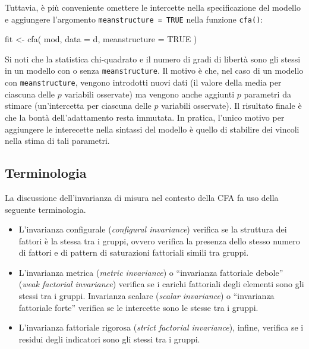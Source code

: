 \documentclass[
  11pt,
]{krantz}
\makeatletter
\newenvironment{Shaded}{\begin{snugshade}}{\end{snugshade}}
\newcommand{\AttributeTok}[1]{\textcolor[rgb]{0.61,0.61,0.61}{#1}}
\newcommand{\ConstantTok}[1]{\textcolor[rgb]{0,0,0}{#1}}
\newcommand{\FunctionTok}[1]{\textcolor[rgb]{0,0,0}{#1}}
\newcommand{\NormalTok}[1]{#1}
\newcommand{\OtherTok}[1]{\textcolor[rgb]{0.37,0.37,0.37}{#1}}
\providecommand{\tightlist}{%
  \setlength{\itemsep}{0pt}\setlength{\parskip}{0pt}}
\newenvironment{kframe}{%
\medskip{}
\setlength{\fboxsep}{.8em}
 \def\at@end@of@kframe{}%
 \ifinner\ifhmode%
  \def\at@end@of@kframe{\end{minipage}}%
  \begin{minipage}{\columnwidth}%
 \fi\fi%
 \def\FrameCommand##1{\hskip\@totalleftmargin \hskip-\fboxsep
 \colorbox{shadecolor}{##1}\hskip-\fboxsep
     \hskip-\linewidth \hskip-\@totalleftmargin \hskip\columnwidth}%
 \MakeFramed {\advance\hsize-\width
   \@totalleftmargin\z@ \linewidth\hsize
   \@setminipage}}%
 {\par\unskip\endMakeFramed%
 \at@end@of@kframe}
\renewenvironment{Shaded}{\begin{kframe}}{\end{kframe}}
\theoremstyle{definition}
\theoremstyle{definition}
\theoremstyle{definition}
\theoremstyle{definition}
\theoremstyle{remark}
\makeatother
\begin{document}
Tuttavia, è più conveniente omettere le intercette nella specificazione del modello e aggiungere l'argomento \texttt{meanstructure\ =\ TRUE} nella funzione \texttt{cfa()}:

\begin{Shaded}
\begin{Highlighting}[]
\NormalTok{fit }\OtherTok{\textless{}{-}} \FunctionTok{cfa}\NormalTok{(}
\NormalTok{  mod,}
  \AttributeTok{data =}\NormalTok{ d,}
  \AttributeTok{meanstructure =} \ConstantTok{TRUE}
\NormalTok{)}
\end{Highlighting}
\end{Shaded}

Si noti che la statistica chi-quadrato e il numero di gradi di libertà sono gli stessi in un modello con o senza \texttt{meanstructure}. Il motivo è che, nel caso di un modello con \texttt{meanstructure}, vengono introdotti nuovi dati (il valore della media per ciascuna delle \(p\) variabili osservate) ma vengono anche aggiunti \(p\) parametri da stimare (un'intercetta per ciascuna delle \(p\) variabili osservate). Il risultato finale è che la bontà dell'adattamento resta immutata. In pratica, l'unico motivo per aggiungere le interecette nella sintassi del modello è quello di stabilire dei vincoli nella stima di tali parametri.

\hypertarget{terminologia}{%
\subsection{Terminologia}\label{terminologia}}

La discussione dell'invarianza di misura nel contesto della CFA fa uso della seguente terminologia.

\begin{itemize}
\tightlist
\item
  L'invarianza configurale (\emph{configural invariance}) verifica se la struttura dei fattori è la stessa tra i gruppi, ovvero verifica la presenza dello stesso numero di fattori e di pattern di saturazioni fattoriali simili tra gruppi.
\item
  L'invarianza metrica (\emph{metric invariance}) o ``invarianza fattoriale debole'' (\emph{weak factorial invariance}) verifica se i carichi fattoriali degli elementi sono gli stessi tra i gruppi. Invarianza scalare (\emph{scalar invariance}) o ``invarianza fattoriale forte'' verifica se le intercette sono le stesse tra i gruppi.
\item
  L'invarianza fattoriale rigorosa (\emph{strict factorial invariance}), infine, verifica se i residui degli indicatori sono gli stessi tra i gruppi.
\end{itemize}
\end{document}
